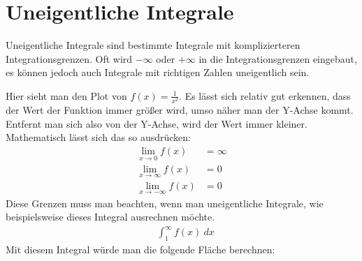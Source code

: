 \section{Uneigentliche Integrale}

\begin{flushleft}
    Uneigentliche Integrale sind bestimmte Integrale mit komplizierteren Integrationsgrenzen.
    Oft wird $-\infty$ oder $+\infty$ in die Integrationsgrenzen eingebaut, es können jedoch auch Integrale mit richtigen Zahlen uneigentlich sein.
\end{flushleft}

\begin{center}
\end{center}

\begin{flushleft}
    Hier sieht man den Plot von $f(x)=\frac{1}{x^2}$.
    Es lässt sich relativ gut erkennen, dass der Wert der Funktion immer größer wird, umso näher man der Y-Achse kommt.
    Entfernt man sich also von der Y-Achse, wird der Wert immer kleiner.
    Mathematisch lässt sich das so ausdrücken:
    \begin{align}
        \lim_{x \to 0} f(x) &= \infty \\
        \lim_{x \to \infty} f(x) &= 0 \\
        \lim_{x \to -\infty} f(x) &= 0
    \end{align}
    Diese Grenzen muss man beachten, wenn man uneigentliche Integrale, wie beispielsweise dieses Integral ausrechnen möchte.
    \begin{align}
        &\int_{1}^{\infty} f(x) \ dx
    \end{align}
    Mit diesem Integral würde man die folgende Fläche berechnen:
\end{flushleft}

\begin{center}
\end{center}

